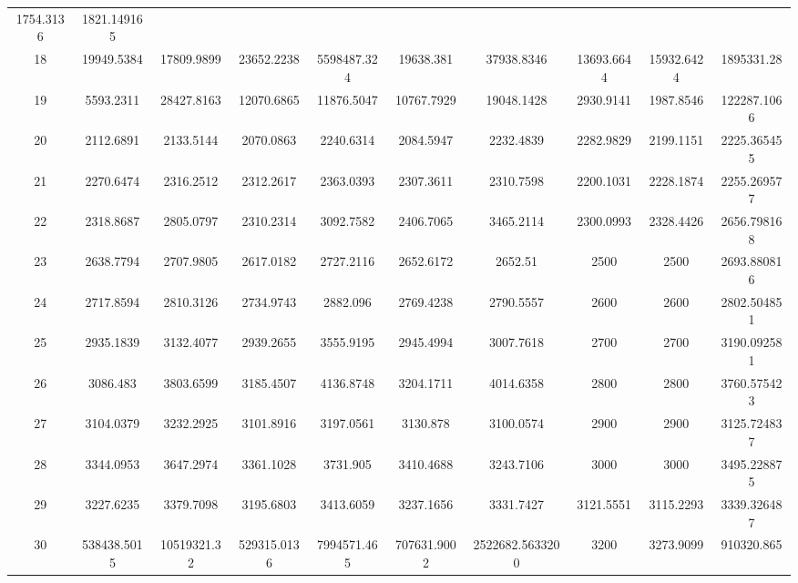 \documentclass[
]{article}
\begin{document}
\begin{justify}
{\begin{table}[h]
\begin{tabular}{||c c c c c c c c c c||}
  1754.3136 & 1821.149165 \\ 18 & 19949.5384 & 17809.9899 & 23652.2238 &
  5598487.324 & 19638.381 & 37938.8346 & 13693.6644 & 15932.6424 & 1895331.28
  \\ 19 & 5593.2311 & 28427.8163 & 12070.6865 & 11876.5047 & 10767.7929 &
  19048.1428 & 2930.9141 & 1987.8546 & 122287.1066 \\ 20 & 2112.6891 &
  2133.5144 & 2070.0863 & 2240.6314 & 2084.5947 & 2232.4839 & 2282.9829 &
  2199.1151 & 2225.365455 \\ 21 & 2270.6474 & 2316.2512 & 2312.2617 &
  2363.0393 & 2307.3611 & 2310.7598 & 2200.1031 & 2228.1874 & 2255.269577 \\
  22 & 2318.8687 & 2805.0797 & 2310.2314 & 3092.7582 & 2406.7065 & 3465.2114 &
  2300.0993 & 2328.4426 & 2656.798168 \\ 23 & 2638.7794 & 2707.9805 &
  2617.0182 & 2727.2116 & 2652.6172 & 2652.51 & 2500 & 2500 & 2693.880816 \\
  24 & 2717.8594 & 2810.3126 & 2734.9743 & 2882.096 & 2769.4238 & 2790.5557 &
  2600 & 2600 & 2802.504851 \\ 25 & 2935.1839 & 3132.4077 & 2939.2655 &
  3555.9195 & 2945.4994 & 3007.7618 & 2700 & 2700 & 3190.092581 \\ 26 &
  3086.483 & 3803.6599 & 3185.4507 & 4136.8748 & 3204.1711 & 4014.6358 & 2800
  & 2800 & 3760.575423 \\ 27 & 3104.0379 & 3232.2925 & 3101.8916 & 3197.0561 &
  3130.878 & 3100.0574 & 2900 & 2900 & 3125.724837 \\ 28 & 3344.0953 &
  3647.2974 & 3361.1028 & 3731.905 & 3410.4688 & 3243.7106 & 3000 & 3000 &
  3495.228875 \\ 29 & 3227.6235 & 3379.7098 & 3195.6803 & 3413.6059 &
  3237.1656 & 3331.7427 & 3121.5551 & 3115.2293 & 3339.326487 \\ 30 &
  538438.5015 & 10519321.32 & 529315.0136 & 7994571.465 & 707631.9002 &
  2522682.5633200 & 3200 & 3273.9099 & 910320.865 \\



\hline
\end{tabular}
\end{table}



\def\labelenumi{\arabic{enumi}.}
\item


\def\labelenumi{\arabic{enumi}.}
\item
\vspace{5mm}
  
}
\end{justify}
\end{document}
